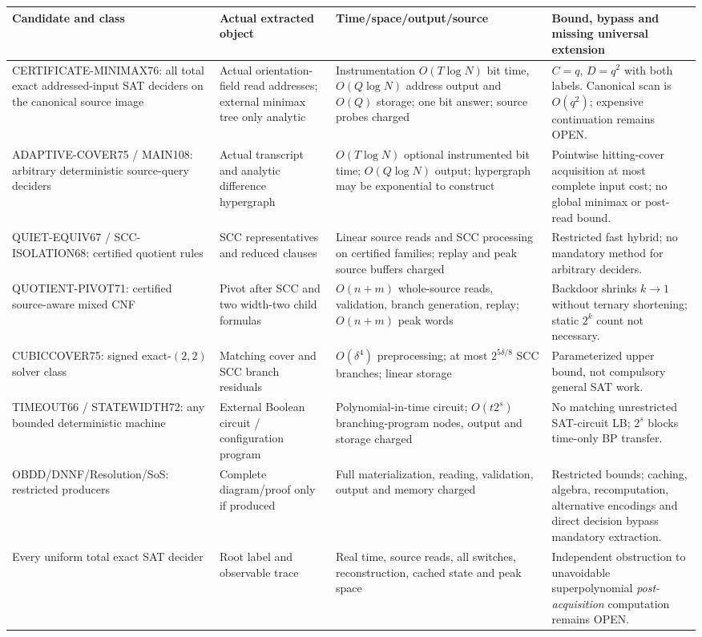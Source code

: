\documentclass[11pt]{article}
\begin{document}
\begin{longtable}{p{.19\linewidth}p{.23\linewidth}p{.26\linewidth}p{.24\linewidth}}
\toprule
Candidate and class & Actual extracted object & Time/space/output/source & Bound, bypass and missing universal extension\\\midrule\endhead
CERTIFICATE-MINIMAX76: all total exact addressed-input SAT deciders on the canonical source image &
Actual orientation-field read addresses; external minimax tree only analytic &
Instrumentation $O(T\log N)$ bit time, $O(Q\log N)$ address output and $O(Q)$ storage; one bit answer; source probes charged &
$C=q$, $D=q^2$ with both labels. Canonical scan is $O(q^2)$; expensive continuation remains OPEN.\\\midrule
ADAPTIVE-COVER75 / MAIN108: arbitrary deterministic source-query deciders &
Actual transcript and analytic difference hypergraph &
$O(T\log N)$ optional instrumented bit time; $O(Q\log N)$ output; hypergraph may be exponential to construct &
Pointwise hitting-cover acquisition at most complete input cost; no global minimax or post-read bound.\\\midrule
QUIET-EQUIV67 / SCC-ISOLATION68: certified quotient rules &
SCC representatives and reduced clauses &
Linear source reads and SCC processing on certified families; replay and peak source buffers charged &
Restricted fast hybrid; no mandatory method for arbitrary deciders.\\\midrule
QUOTIENT-PIVOT71: certified source-aware mixed CNF &
Pivot after SCC and two width-two child formulas &
$O(n+m)$ whole-source reads, validation, branch generation, replay; $O(n+m)$ peak words &
Backdoor shrinks $k\to1$ without ternary shortening; static $2^k$ count not necessary.\\\midrule
CUBICCOVER75: signed exact-$(2,2)$ solver class &
Matching cover and SCC branch residuals &
$O(\delta^4)$ preprocessing; at most $2^{5\delta/8}$ SCC branches; linear storage &
Parameterized upper bound, not compulsory general SAT work.\\\midrule
TIMEOUT66 / STATEWIDTH72: any bounded deterministic machine &
External Boolean circuit / configuration program &
Polynomial-in-time circuit; $O(t2^s)$ branching-program nodes, output and storage charged &
No matching unrestricted SAT-circuit LB; $2^s$ blocks time-only BP transfer.\\\midrule
OBDD/DNNF/Resolution/SoS: restricted producers &
Complete diagram/proof only if produced &
Full materialization, reading, validation, output and memory charged &
Restricted bounds; caching, algebra, recomputation, alternative encodings and direct decision bypass mandatory extraction.\\\midrule
Every uniform total exact SAT decider &
Root label and observable trace &
Real time, source reads, all switches, reconstruction, cached state and peak space &
Independent obstruction to unavoidable superpolynomial \emph{post-acquisition} computation remains OPEN.\\\bottomrule
\end{longtable}\normalsize
\end{document}
